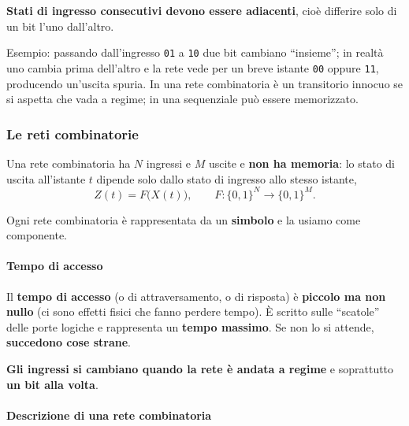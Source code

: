 \documentclass[11pt,a4paper]{article}
\begin{document}
\begin{nota}[Regola]
\textbf{Stati di ingresso consecutivi devono essere adiacenti}, cioè differire solo di un bit l'uno dall'altro.
\end{nota}

\begin{integrazione}
Esempio: passando dall'ingresso \texttt{01} a \texttt{10} due bit cambiano ``insieme''; in realtà uno cambia prima dell'altro e la rete vede per un breve istante \texttt{00} oppure \texttt{11}, producendo un'uscita spuria. In una rete combinatoria è un transitorio innocuo se si aspetta che vada a regime; in una sequenziale può essere memorizzato.
\end{integrazione}

\subsubsection*{Le reti combinatorie}

\begin{integrazione}
Una rete combinatoria ha $N$ ingressi e $M$ uscite e \textbf{non ha memoria}: lo stato di uscita all'istante $t$ dipende solo dallo stato di ingresso allo stesso istante,
\[
Z(t) = F\big(X(t)\big), \qquad F:\{0,1\}^N \to \{0,1\}^M .
\]
\end{integrazione}

Ogni rete combinatoria è rappresentata da un \textbf{simbolo} e la usiamo come componente.

\paragraph*{Tempo di accesso}

Il \textbf{tempo di accesso} (o di attraversamento, o di risposta) è \textbf{piccolo ma non nullo} (ci sono effetti fisici che fanno perdere tempo). È scritto sulle ``scatole'' delle porte logiche e rappresenta un \textbf{tempo massimo}. Se non lo si attende, \textbf{succedono cose strane}.

\begin{nota}[Regola]
\textbf{Gli ingressi si cambiano quando la rete è andata a regime} e soprattutto \textbf{un bit alla volta}.
\end{nota}

\paragraph*{Descrizione di una rete combinatoria}
\end{document}
